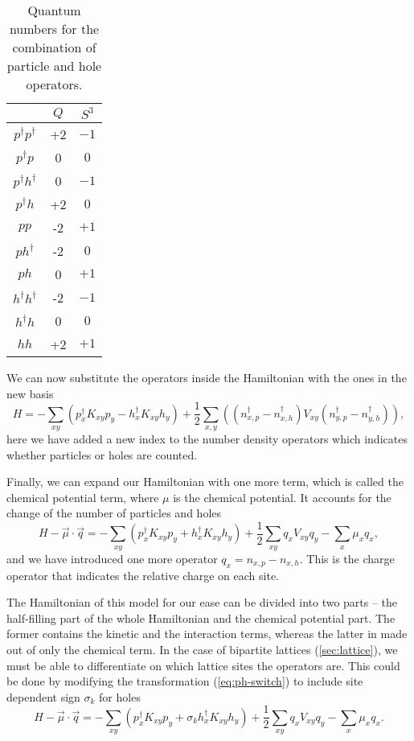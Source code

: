 \begin{table}[h]
    \centering
    \begin{tabular}{c|cc}
        & $Q$ & $S^3$ \\
    \hline
        $p^\dagger p^\dagger$ & +2 & $-1$ \\
        $p^\dagger p$ & 0 & $0$ \\
        $p^\dagger h^\dagger$ & 0 & $-1$ \\
        $p^\dagger h$ & +2 & $0$ \\
        $p p$ & -2 & $+1$ \\
        $p h^\dagger$ & -2 & $0$ \\
        $p h$ & 0 & $+1$ \\
        $h^\dagger h^\dagger$ & -2 & $-1$ \\
        $h^\dagger h$ & 0 & $0$ \\
        $h h$ & +2 & $+1$ \\
    \end{tabular}
    \caption{Quantum numbers for the combination of particle and hole operators.}
    \label{tab:ph-comb}
\end{table}

We can now substitute the operators inside the Hamiltonian with the ones in the new basis
\begin{equation}
    H = - \sum_{xy} \left( p^\dagger_x K_{xy} p_y - h^\dagger_x K_{xy} h_y \right) + \frac{1}{2} \sum_{x,y} \left( (n^\dagger_{x,p} - n^\dagger_{x,h}) V_{xy} (n^\dagger_{y,p} - n^\dagger_{y,h}) \right),
\end{equation}
here we have added a new index to the number density operators which indicates whether particles or holes are counted.

Finally, we can expand our Hamiltonian with one more term, which is called the chemical potential term, where $\mu$ is the chemical potential. It accounts for the change of the number of particles and holes
\begin{equation}
    H - \vec{\mu}\cdot\vec{q} = - \sum_{xy} \left( p^\dagger_x K_{xy} p_y + h^\dagger_x K_{xy} h_y \right) + \frac{1}{2}\sum_{xy} q_x V_{xy} q_y - \sum_{x} \mu_x q_x,
\end{equation}
and we have introduced one more operator $q_x = n_{x,p} - n_{x,h}$. This is the charge operator that indicates the relative charge on each site. 

The Hamiltonian of this model for our ease can be divided into two parts -- the half-filling part of the whole Hamiltonian and the chemical potential part. The former contains the kinetic and the interaction terms, whereas the latter in made out of only the chemical term. In the case of bipartite lattices (\cref{sec:lattice}), we must be able to differentiate on which lattice sites the operators are. This could be done by modifying the transformation (\cref{eq:ph-switch}) to include site dependent sign $\sigma_k$ for holes
\begin{equation}
    H - \vec{\mu}\cdot\vec{q} = - \sum_{xy} \left( p^\dagger_x K_{xy} p_y + \sigma_k h^\dagger_x K_{xy} h_y \right) + \frac{1}{2}\sum_{xy} q_x V_{xy} q_y - \sum_{x} \mu_x q_x.
\end{equation}

